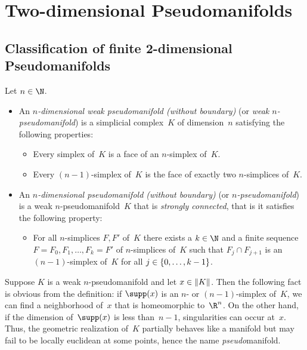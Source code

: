 \chapter{Two-dimensional Pseudomanifolds}
\section{Classification of finite 2-dimensional Pseudomanifolds}
\begin{thDef}
    \label{ch4:def:pseudomanifold}
    Let $n\in\N$. 
    \begin{itemize}
        \item
            An \emph{$n$-dimensional weak pseudomanifold (without boundary)}
            (or \emph{weak $n$-pseudomanifold}) is a simplicial complex~$K$
            of dimension~$n$ satisfying the following properties:
            \begin{itemize}
                \item
                    Every simplex of~$K$ is a face of an $n$-simplex of~$K$.
                \item
                    Every $(n{-}1)$-simplex of~$K$ is the face of exactly two
                    $n$-simplices of~$K$.
            \end{itemize}
            
        \item
            An \emph{$n$-dimensional pseudomanifold (without boundary)} (or
            \emph{$n$-pseudomanifold}) is a weak $n$-pseudomanifold~$K$ that is
            \emph{strongly connected}, that is it satisfies the following
            property:
            \begin{itemize}
                \item
                    For all $n$-simplices $F,F'$ of~$K$ there exists a $k\in\N$ and a
                    finite sequence $F=F_0,F_1,\dots,F_k=F'$ of $n$-simplices of~$K$
                    such that  $F_j\cap F_{j+1}$ is an $(n{-}1)$-simplex of~$K$ 
                    for all $j\in\{0,\ldots,k-1\}$.
            \end{itemize}
            
    \end{itemize}
\end{thDef}

Suppose $K$ is a weak $n$-pseudomanifold and let $x\in\lVert K\rVert$.
Then the following fact is obvious from the definition:
if $\supp(x)$ is an $n$- or $(n{-}1)$-simplex of~$K$,
we can find a neighborhood of~$x$ that is homeomorphic
to~$\R^n$. On the other hand, if the dimension of~$\supp(x)$
is less than~$n{-}1$, singularities can occur at~$x$.
Thus, the geometric realization of~$K$ partially behaves like a manifold but may
fail to be locally euclidean at some points, hence the name \emph{pseudo}manifold.

